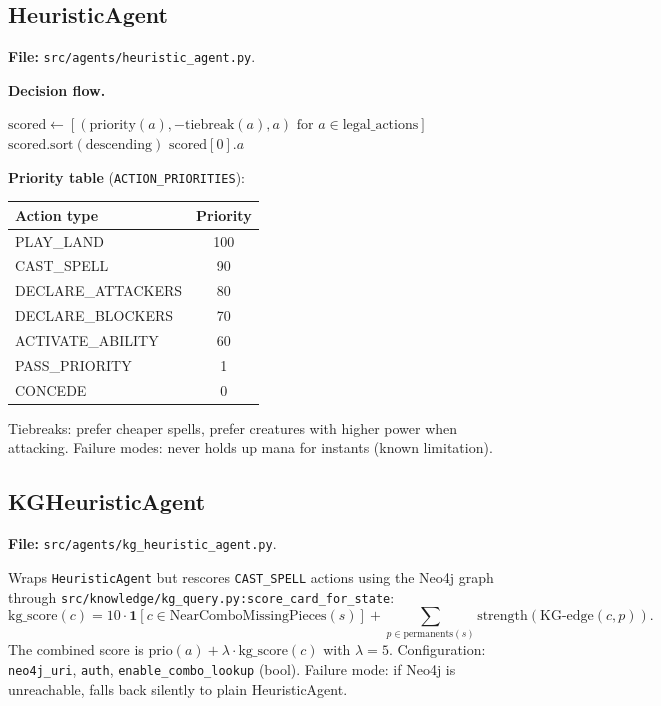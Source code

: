 \documentclass[11pt,a4paper]{article}
\begin{document}
\subsection{HeuristicAgent}
\textbf{File:} \texttt{src/agents/heuristic\_agent.py}.

\medskip\noindent\textbf{Decision flow.}
\begin{algorithmic}[1]
\State $\text{scored} \gets [(\text{priority}(a), -\text{tiebreak}(a), a)\text{ for }a \in \text{legal\_actions}]$
\State $\text{scored.sort}(\text{descending})$
\State \Return $\text{scored}[0].a$
\end{algorithmic}

\noindent\textbf{Priority table} (\texttt{ACTION\_PRIORITIES}):
\begin{center}\small
\begin{tabular}{lc}
\toprule
Action type & Priority \\
\midrule
PLAY\_LAND          & 100 \\
CAST\_SPELL         &  90 \\
DECLARE\_ATTACKERS  &  80 \\
DECLARE\_BLOCKERS   &  70 \\
ACTIVATE\_ABILITY   &  60 \\
PASS\_PRIORITY      &   1 \\
CONCEDE             &   0 \\
\bottomrule
\end{tabular}
\end{center}

Tiebreaks: prefer cheaper spells, prefer creatures with higher power
when attacking.  Failure modes: never holds up mana for instants
(known limitation).

\subsection{KGHeuristicAgent}
\textbf{File:} \texttt{src/agents/kg\_heuristic\_agent.py}.

Wraps \texttt{HeuristicAgent} but rescores \texttt{CAST\_SPELL} actions
using the Neo4j graph through
\texttt{src/knowledge/kg\_query.py:score\_card\_for\_state}:
%
\begin{equation}
\text{kg\_score}(c) =
  10 \cdot \mathbf{1}[c \in \text{NearComboMissingPieces}(s)]
  + \sum_{p \in \text{permanents}(s)} \text{strength}(\text{KG-edge}(c,p)).
\end{equation}
%
The combined score is $\text{prio}(a) + \lambda \cdot \text{kg\_score}(c)$ with
$\lambda{=}5$.  Configuration: \texttt{neo4j\_uri}, \texttt{auth},
\texttt{enable\_combo\_lookup} (bool).  Failure mode: if Neo4j is
unreachable, falls back silently to plain HeuristicAgent.
\end{document}
